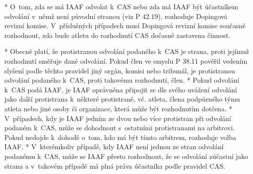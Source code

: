 * O~tom, zda se má IAAF odvolat k~CAS nebo zda má IAAF být účastníkem odvolání v~němž není původní stranou (viz P 42.19), rozhoduje Dopingová revizní komise. V~příslušných případech musí Dopingová revizní komise současně rozhodnout, zda bude atletu do rozhodnutí CAS dočasně zastavena činnost.

* Obecně platí, že protistranou odvolání podaného k~CAS je strana, proti jejímuž rozhodnutí směřuje dané odvolání. Pokud člen ve smyslu P 38.11 pověřil vedením slyšení podle těchto pravidel jiný orgán, komisi nebo tribunál, je protistranou odvolání podaného k~CAS, proti takovému rozhodnutí, člen.
* Pokud odvolání k~CAS podá IAAF, je IAAF oprávněna připojit se dle svého uvážení odvolání jako další protistrana k~některé protistraně, vč. atleta, člena podpůrného týmu atleta nebo jiné osoby či organizace, která může být rozhodnutím dotčena.
* V~případech, kdy je IAAF jedním ze dvou nebo více protistran při odvolání podaném k~CAS, může se dohodnout s~ostatními protistranami na arbitrovi. Pokud nedojde k~dohodě o~tom, kdo má být tímto arbitrem, rozhoduje volba IAAF.
* V~kterémkoliv případě, kdy IAAF není jednou ze stran odvolání podanému k~CAS, může se IAAF přesto rozhodnout, že se odvolání zúčastní jako strana a v~takovém případě má plná práva účastníka podle pravidel CAS.

